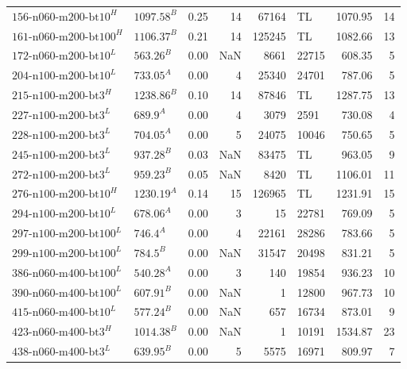 \begin{table}[ht]
\begin{tabular}{llrrrlrr}
		$\text{156-n060-m200-bt10}^H$  & $\text{1097.58}^B$ & 0.25 & 14    & 67164  & TL    & 1070.95 & 14    \\
		$\text{161-n060-m200-bt100}^H$ & $\text{1106.37}^B$ & 0.21 & 14    & 125245 & TL    & 1082.66 & 13    \\
		$\text{172-n060-m200-bt10}^L$  & $\text{563.26}^B$  & 0.00 & NaN   & 8661   & 22715 & 608.35  & 5     \\
		$\text{204-n100-m200-bt10}^L$  & $\text{733.05}^A$  & 0.00 & 4     & 25340  & 24701 & 787.06  & 5     \\
		$\text{215-n100-m200-bt3}^H$   & $\text{1238.86}^B$ & 0.10 & 14    & 87846  & TL    & 1287.75 & 13    \\
		$\text{227-n100-m200-bt3}^L$   & $\text{689.9}^A$   & 0.00 & 4     & 3079   & 2591  & 730.08  & 4     \\
		$\text{228-n100-m200-bt3}^L$   & $\text{704.05}^A$  & 0.00 & 5     & 24075  & 10046 & 750.65  & 5     \\
		$\text{245-n100-m200-bt3}^L$   & $\text{937.28}^B$  & 0.03 & NaN   & 83475  & TL    & 963.05  & 9     \\
		$\text{272-n100-m200-bt3}^L$   & $\text{959.23}^B$  & 0.05 & NaN   & 8420   & TL    & 1106.01 & 11    \\
		$\text{276-n100-m200-bt10}^H$  & $\text{1230.19}^A$ & 0.14 & 15    & 126965 & TL    & 1231.91 & 15    \\
		$\text{294-n100-m200-bt10}^L$  & $\text{678.06}^A$  & 0.00 & 3     & 15     & 22781 & 769.09  & 5     \\
		$\text{297-n100-m200-bt100}^L$ & $\text{746.4}^A$   & 0.00 & 4     & 22161  & 28286 & 783.66  & 5     \\
		$\text{299-n100-m200-bt100}^L$ & $\text{784.5}^B$   & 0.00 & NaN   & 31547  & 20498 & 831.21  & 5     \\
		$\text{386-n060-m400-bt100}^L$ & $\text{540.28}^A$  & 0.00 & 3     & 140    & 19854 & 936.23  & 10    \\
		$\text{390-n060-m400-bt100}^L$ & $\text{607.91}^B$  & 0.00 & NaN   & 1      & 12800 & 967.73  & 10    \\
		$\text{415-n060-m400-bt10}^L$  & $\text{577.24}^B$  & 0.00 & NaN   & 657    & 16734 & 873.01  & 9     \\
		$\text{423-n060-m400-bt3}^H$   & $\text{1014.38}^B$ & 0.00 & NaN   & 1      & 10191 & 1534.87 & 23    \\
		$\text{438-n060-m400-bt3}^L$   & $\text{639.95}^B$  & 0.00 & 5     & 5575   & 16971 & 809.97  & 7     \\

\end{tabular}
\end{table}
